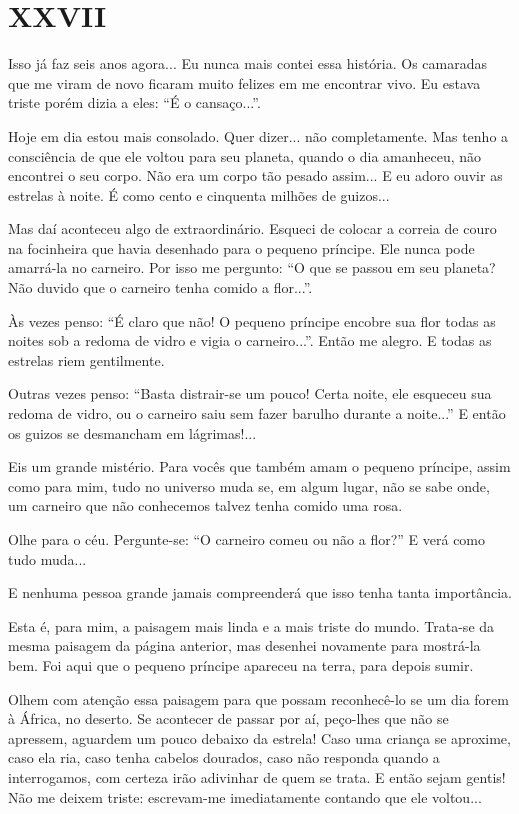 \chapter{XXVII}

Isso já faz seis anos agora... Eu nunca mais contei essa história. Os
camaradas que me viram de novo ficaram muito felizes em me encontrar
vivo. Eu estava triste porém dizia a eles: ``É o cansaço...''.

Hoje em dia estou mais consolado. Quer dizer... não completamente. Mas
tenho a consciência de que ele voltou para seu planeta, quando o dia
amanheceu, não encontrei o seu corpo. Não era um corpo tão pesado
assim... E eu adoro ouvir as estrelas à noite. É como cento e cinquenta
milhões de guizos...

Mas daí aconteceu algo de extraordinário. Esqueci de colocar a correia
de couro na focinheira que havia desenhado para o pequeno príncipe. Ele
nunca pode amarrá-la no carneiro. Por isso me pergunto: ``O que se
passou em seu planeta? Não duvido que o carneiro tenha comido a
flor...''.

Às vezes penso: ``É claro que não! O pequeno príncipe encobre sua flor
todas as noites sob a redoma de vidro e vigia o carneiro...''. Então me
alegro. E todas as estrelas riem gentilmente.

Outras vezes penso: ``Basta distrair-se um pouco! Certa noite, ele
esqueceu sua redoma de vidro, ou o carneiro saiu sem fazer barulho
durante a noite...'' E então os guizos se desmancham em lágrimas!...

Eis um grande mistério. Para vocês que também amam o pequeno príncipe,
assim como para mim, tudo no universo muda se, em algum lugar, não se
sabe onde, um carneiro que não conhecemos talvez tenha comido uma rosa.

Olhe para o céu. Pergunte-se: ``O carneiro comeu ou não a flor?'' E verá
como tudo muda...

E nenhuma pessoa grande jamais compreenderá que isso tenha tanta
importância.

Esta é, para mim, a paisagem mais linda e a mais triste do mundo.
Trata-se da mesma paisagem da página anterior, mas desenhei novamente
para mostrá-la bem. Foi aqui que o pequeno príncipe apareceu na terra,
para depois sumir.

Olhem com atenção essa paisagem para que possam reconhecê-lo se um dia
forem à África, no deserto. Se acontecer de passar por aí, peço-lhes que
não se apressem, aguardem um pouco debaixo da estrela! Caso uma criança
se aproxime, caso ela ria, caso tenha cabelos dourados, caso não
responda quando a interrogamos, com certeza irão adivinhar de quem se
trata. E então sejam gentis! Não me deixem triste: escrevam-me
imediatamente contando que ele voltou...
